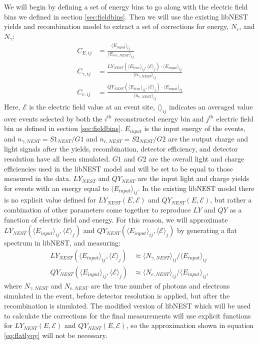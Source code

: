We will begin by defining a set of energy bins to go along with the electric field bins we defined in section \ref{sec:fieldbins}. Then we will use the existing libNEST yields and recombination model to extract a set of corrections for energy, $N_e$, and $N_{\gamma}$:
\begin{align}
\label{eq:nestEcorr}C_{E,ij}&=\frac{\langle E_{input} \rangle_{ij}}{\langle E_{rec,NEST} \rangle_{ij}} \\[1em]
\label{eq:nestS1corr}C_{\gamma,ij}&=\frac{LY_{NEST}(\langle E_{true} \rangle_{ij},\langle \mathcal{E} \rangle_j)\cdot \langle E_{input} \rangle_{ij}}{\langle n_{\gamma,NEST} \rangle_{ij}} \\[1em]
\label{eq:nestS2corr}C_{e,ij}&=\frac{QY_{NEST}(\langle E_{true} \rangle_{ij},\langle \mathcal{E} \rangle_j)\cdot \langle E_{input} \rangle_{ij}}{\langle n_{e,NEST} \rangle_{ij}} 
\end{align}
Here, $\mathcal{E}$ is the electric field value at an event site, $\langle \rangle_{ij}$ indicates an averaged value over events selected by both the $i^{th}$ reconstructed energy bin and $j^{th}$ electric field bin as defined in section \ref{sec:fieldbins}. $E_{input}$ is the input energy of the events, and $n_{\gamma,NEST}=S1_{NEST}/G1$ and $n_{e,NEST}=S2_{NEST}/G2$ are the output charge and light signals after the yields, recombination, detector efficiency, and detector resolution have all been simulated. $G1$ and $G2$ are the overall light and charge efficiencies used in the libNEST model and will be set to be equal to those measured in the data. $LY_{NEST}$ and $QY_{NEST}$ are the input light and charge yields for events with an energy equal to $\langle E_{input} \rangle_{ij}$. In the existing libNEST model there is no explicit value defined for $LY_{NEST}(E,\mathcal{E})$ and $QY_{NEST}(E,\mathcal{E})$, but rather a combination of other parameters come together to reproduce $LY$ and $QY$ as a function of electric field and energy. For this reason, we will approximate $LY_{NEST}(\langle E_{input} \rangle_{ij},\langle \mathcal{E} \rangle_j)$ and $QY_{NEST}(\langle E_{input} \rangle_{ij},\langle \mathcal{E} \rangle_j)$ by generating a flat spectrum in libNEST, and measuring: 
\begin{equation}\label{eq:flatlyqy}
\begin{split}
LY_{NEST}(\langle E_{input} \rangle_{ij},\langle \mathcal{E} \rangle_j) &\approx \langle N_{\gamma,NEST} \rangle_{ij}/\langle E_{input} \rangle_{ij}\\ 
QY_{NEST}(\langle E_{input} \rangle_{ij},\langle \mathcal{E} \rangle_j) &\approx \langle N_{e,NEST} \rangle_{ij}/\langle E_{input} \rangle_{ij},
\end{split}
\end{equation}
where $N_{\gamma,NEST}$ and $N_{e,NEST}$ are the true number of photons and electrons simulated in the event, before detector resolution is applied, but after the recombination is simulated. The modified version of libNEST which will be used to calculate the corrections for the final measurements will use explicit functions for $LY_{NEST}(E,\mathcal{E})$ and $QY_{NEST}(E,\mathcal{E})$, so the approximation shown in equation \ref{eq:flatlyqy} will not be necessary.

